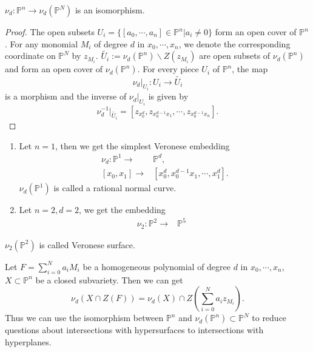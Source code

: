 \begin{proposition}
	$ \nu_d:\mathbb{P}^n\to \nu_d(\mathbb{P}^N) $ is an isomorphism.
\end{proposition}
\begin{proof}
	The open subsets $ U_i=\{ [a_0,\cdots,a_n]\in \mathbb{P}^n |a_i\neq 0 \} $ form an open cover of $ \mathbb{P}^n $. For any monomial $ M_i $ of degree $ d $ in $ x_0,\cdots,x_n $, we denote the corresponding coordinate on $ \mathbb{P}^N $ by $ z_{M_i} $.  $ \tilde{U_i}:= \nu_d(\mathbb{P}^n)\backslash Z(z_{M_i}) $ are open subsets of $ \nu_d(\mathbb{P}^n) $ and form an open cover of $ \nu_d(\mathbb{P}^n) $. For every piece $ U_i $ of $ \mathbb{P}^n $, the map
	$$
		\nu_d|_{U_i}:U_i\to \tilde{U_i}
	$$
	is a morphism and the inverse of $ \nu_d|_{U_i} $ is given by
	$$
		\nu_d^{-1}|_{\tilde{U_i}}=[z_{x_0^d},z_{x_0^{d-1}x_1},\cdots,z_{x_0^{d-1}x_n}].
	$$
\end{proof}
\begin{example}
	\noindent\begin{enumerate}
		\item Let $ n=1 $, then we get the simplest Veronese embedding
		      \begin{align*}
			      \nu_d:\mathbb{P}^1  \to & \mathbb{P}^d     ,                  \\
			      {}[x_0,x_1]  \to        & [x_0^d,x_0^{d-1}x_1,\cdots,x_1^d] .
		      \end{align*}
		      $ \nu_d(\mathbb{P}^1) $ is called a rational normal curve.
		\item Let $ n=2,d=2 $, we get the embedding
		      $$
			      \begin{array}{ccc}
				      \nu_2:\mathbb{P}^2\to & \mathbb{P}^5 & {}
			      \end{array}
		      $$
	\end{enumerate}
	$ \nu_2(\mathbb{P}^2) $ is called Veronese surface.
\end{example}
\begin{remark}
	Let $ F=\sum\limits_{i=0}^{N}a_iM_i $ be a homogeneous polynomial of degree $ d $ in $ x_0,\cdots,x_n $, $ X\subset\mathbb{P}^n $ be a closed subvariety. Then we can get
	\begin{equation}
		\nu_d(X\cap Z(F))=\nu_d(X)\cap Z(\sum\limits_{i=0}^{N}a_iz_{M_i}).
	\end{equation}
	Thus we can use the isomorphism between $ \mathbb{P}^n $ and $ \nu_d(\mathbb{P}^n)\subset \mathbb{P}^N $ to reduce questions about intersections with hypersurfaces to intersections with hyperplanes.
\end{remark}
